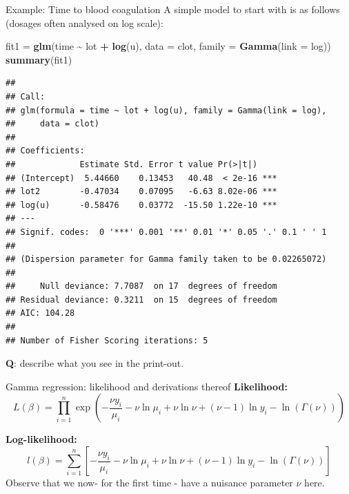 \documentclass[
  ignorenonframetext,
]{beamer}
\newenvironment{Shaded}{\begin{snugshade}}{\end{snugshade}}
\newcommand{\AttributeTok}[1]{\textcolor[rgb]{0.13,0.29,0.53}{#1}}
\newcommand{\FunctionTok}[1]{\textcolor[rgb]{0.13,0.29,0.53}{\textbf{#1}}}
\newcommand{\NormalTok}[1]{#1}
\newcommand{\OtherTok}[1]{\textcolor[rgb]{0.56,0.35,0.01}{#1}}
\newcommand{\SpecialCharTok}[1]{\textcolor[rgb]{0.81,0.36,0.00}{\textbf{#1}}}
\begin{document}
\begin{frame}[fragile]
\begin{block}{Example: Time to blood coagulation}
\protect\hypertarget{example-time-to-blood-coagulation}{}
A simple model to start with is as follows (dosages often analysed on
log scale):

\tiny

\begin{Shaded}
\begin{Highlighting}[]
\NormalTok{fit1 }\OtherTok{=} \FunctionTok{glm}\NormalTok{(time }\SpecialCharTok{\textasciitilde{}}\NormalTok{ lot }\SpecialCharTok{+} \FunctionTok{log}\NormalTok{(u), }\AttributeTok{data =}\NormalTok{ clot, }\AttributeTok{family =} \FunctionTok{Gamma}\NormalTok{(}\AttributeTok{link =}\NormalTok{ log))}
\FunctionTok{summary}\NormalTok{(fit1)}
\end{Highlighting}
\end{Shaded}

\begin{verbatim}
## 
## Call:
## glm(formula = time ~ lot + log(u), family = Gamma(link = log), 
##     data = clot)
## 
## Coefficients:
##             Estimate Std. Error t value Pr(>|t|)    
## (Intercept)  5.44660    0.13453   40.48  < 2e-16 ***
## lot2        -0.47034    0.07095   -6.63 8.02e-06 ***
## log(u)      -0.58476    0.03772  -15.50 1.22e-10 ***
## ---
## Signif. codes:  0 '***' 0.001 '**' 0.01 '*' 0.05 '.' 0.1 ' ' 1
## 
## (Dispersion parameter for Gamma family taken to be 0.02265072)
## 
##     Null deviance: 7.7087  on 17  degrees of freedom
## Residual deviance: 0.3211  on 15  degrees of freedom
## AIC: 104.28
## 
## Number of Fisher Scoring iterations: 5
\end{verbatim}

\normalsize

\textbf{Q}: describe what you see in the print-out.
\end{block}
\end{frame}

\begin{frame}{Gamma regression: likelihood and derivations thereof}
\protect\hypertarget{gamma-regression-likelihood-and-derivations-thereof}{}
\textbf{Likelihood:}
\[L(\beta)=\prod_{i=1}^n \exp(-\frac{\nu y_i}{\mu_i}-\nu \ln \mu_i +\nu \ln \nu +(\nu-1)\ln y_i -\ln(\Gamma(\nu)))\]

\textbf{Log-likelihood:}
\[l(\beta)=\sum_{i=1}^n [-\frac{\nu y_i}{\mu_i}-\nu \ln \mu_i +\nu \ln \nu +(\nu-1)\ln y_i -\ln(\Gamma(\nu))]\]
Observe that we now- for the first time - have a nuisance parameter
\(\nu\) here.
\end{frame}
\end{document}
